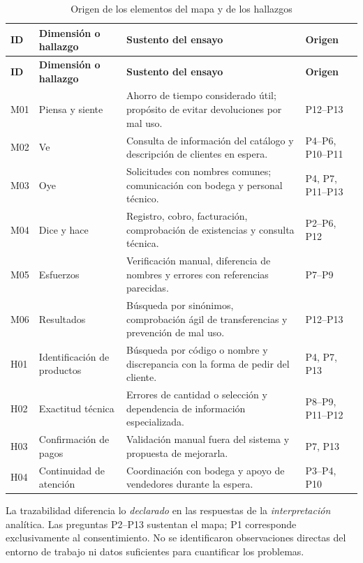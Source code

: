 \begingroup
\small
\renewcommand{\arraystretch}{1.13}
\setlength{\LTpre}{6pt}
\setlength{\LTpost}{6pt}
\begin{longtable}{@{}>{\raggedright\arraybackslash}p{.09\linewidth}>{\raggedright\arraybackslash}p{.29\linewidth}>{\raggedright\arraybackslash}p{.42\linewidth}>{\raggedright\arraybackslash}p{.08\linewidth}@{}}
\caption{Origen de los elementos del mapa y de los hallazgos}\label{tab:trazabilidad-empatia}\\
\toprule
\textbf{ID} & \textbf{Dimensión o hallazgo} & \textbf{Sustento del ensayo} & \textbf{Origen} \\
\midrule
\endfirsthead
\toprule
\textbf{ID} & \textbf{Dimensión o hallazgo} & \textbf{Sustento del ensayo} & \textbf{Origen} \\
\midrule
\endhead
\bottomrule
\endlastfoot
M01 & Piensa y siente & Ahorro de tiempo considerado útil; propósito de evitar devoluciones por mal uso. & P12--P13 \\
M02 & Ve & Consulta de información del catálogo y descripción de clientes en espera. & P4--P6, P10--P11 \\
M03 & Oye & Solicitudes con nombres comunes; comunicación con bodega y personal técnico. & P4, P7, P11--P13 \\
M04 & Dice y hace & Registro, cobro, facturación, comprobación de existencias y consulta técnica. & P2--P6, P12 \\
M05 & Esfuerzos & Verificación manual, diferencia de nombres y errores con referencias parecidas. & P7--P9 \\
M06 & Resultados & Búsqueda por sinónimos, comprobación ágil de transferencias y prevención de mal uso. & P12--P13 \\
H01 & Identificación de productos & Búsqueda por código o nombre y discrepancia con la forma de pedir del cliente. & P4, P7, P13 \\
H02 & Exactitud técnica & Errores de cantidad o selección y dependencia de información especializada. & P8--P9, P11--P12 \\
H03 & Confirmación de pagos & Validación manual fuera del sistema y propuesta de mejorarla. & P7, P13 \\
H04 & Continuidad de atención & Coordinación con bodega y apoyo de vendedores durante la espera. & P3--P4, P10 \\
\end{longtable}
\endgroup

La trazabilidad diferencia lo \emph{declarado} en las respuestas de la \emph{interpretación} analítica. Las preguntas P2--P13 sustentan el mapa; P1 corresponde exclusivamente al consentimiento. No se identificaron observaciones directas del entorno de trabajo ni datos suficientes para cuantificar los problemas.

